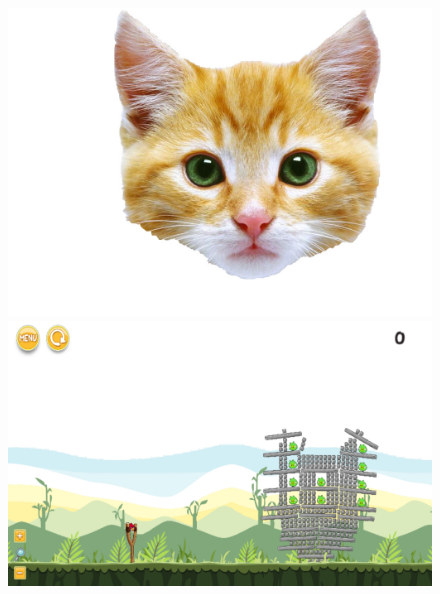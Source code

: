 \documentclass{dalthesis}
\begin{document}
\begin{figure}
  \includegraphics[width=\textwidth,height=\textheight,keepaspectratio]{levels/pictures/animals/cat.jpg}
  \includegraphics[width=\textwidth,height=\textheight,keepaspectratio]{levels/screenshots/animals/cat.png}
\end{figure}
\end{document}
